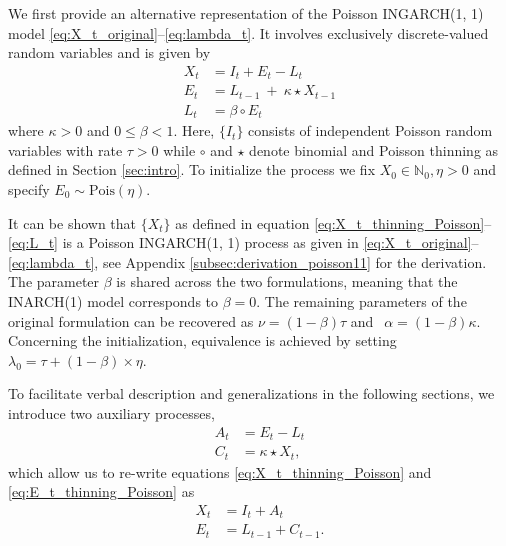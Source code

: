 \documentclass{article}
\begin{document}
We first provide an alternative representation of the Poisson INGARCH(1, 1) model \eqref{eq:X_t_original}--\eqref{eq:lambda_t}. It involves exclusively discrete-valued random variables and is given by
\begin{align}
X_t & = I_t + E_t - L_t \label{eq:X_t_thinning_Poisson}\\
E_t & = L_{t - 1} \ + \ \kappa \star X_{t - 1}\label{eq:E_t_thinning_Poisson}\\
L_t & = \beta \circ E_t \label{eq:L_t}
\end{align}
where $\kappa > 0$ and $0 \leq \beta < 1$. Here, $\{I_t\}$ consists of independent Poisson random variables with rate $\tau > 0$ while $\circ$ and $\star$ denote binomial and Poisson thinning as defined in Section \ref{sec:intro}. %
To initialize the process we fix $X_0 \in \mathbb{N}_0, \eta > 0$ and specify $E_0 \sim \text{Pois}\left(\eta \right)$.

It can be shown that $\{X_t\}$ as defined in equation \eqref{eq:X_t_thinning_Poisson}--\eqref{eq:L_t} is a Poisson INGARCH(1, 1) process as given in \eqref{eq:X_t_original}--\eqref{eq:lambda_t}, see Appendix \ref{subsec:derivation_poisson11} for the derivation. The parameter $\beta$ is shared across the two formulations, meaning that the INARCH(1) model corresponds to $\beta = 0$. The remaining parameters of the original formulation can be recovered as
$
\nu = (1 - \beta)\tau$ and $ \ \
\alpha = (1 - \beta)\kappa.
$
Concerning the initialization, equivalence is achieved by setting $\lambda_0 = \tau + (1 - \beta) \times \eta$.

To facilitate verbal description and generalizations in the following sections, we introduce two auxiliary processes,
\begin{align}
A_t & = E_t - L_t \label{eq:A_t}\\
C_t & = \kappa \star X_t \label{eq:C_t},
\end{align}
which allow us to re-write equations \eqref{eq:X_t_thinning_Poisson} and \eqref{eq:E_t_thinning_Poisson} as
\begin{align}
X_t & = I_t + A_t\label{eq:X_t_v2}\\
E_t & = L_{t - 1} + C_{t - 1}.\label{eq:juv_t_v2}
\end{align}
\end{document}
